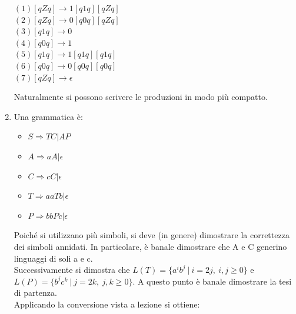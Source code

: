 \documentclass[a4paper,11pt]{article}
\begin{document}
\begin{enumerate}
\begin{minipage}{\linewidth}
        $(1) [qZq] \rightarrow 1[q1q][qZq]$\\
        $(2) [qZq] \rightarrow 0[q0q][qZq]$\\
        $(3) [q1q] \rightarrow 0$\\
        $(4) [q0q] \rightarrow 1$\\
        $(5) [q1q] \rightarrow 1[q1q][q1q]$\\
        $(6) [q0q] \rightarrow 0[q0q][q0q]$\\
        $(7) [qZq] \rightarrow \epsilon$\\
      \end{minipage}
      Naturalmente si possono scrivere le produzioni in modo più compatto.
       \item Una grammatica è:
       \begin{itemize}
       \item $S \Rightarrow TC | AP$
    \item $A \Rightarrow aA | \epsilon$
\item $C \Rightarrow cC | \epsilon$
\item $T \Rightarrow aaTb | \epsilon$
\item $P \Rightarrow bbPc | \epsilon $
       \end{itemize}
       Poiché si utilizzano più simboli, si deve (in genere) dimostrare la correttezza dei simboli annidati. In particolare, è banale dimostrare che A e C generino linguaggi di soli a e c.\\
       Successivamente si dimostra che $L(T)=\{a^ib^j \ |\ i=2j, \ i,j\geq 0 \}$ e $L(P)=\{b^jc^k \ |\ j=2k, \ j,k\geq 0 \}$. A questo punto è banale dimostrare la tesi di partenza.\\
       Applicando la conversione vista a lezione si ottiene:\\

\end{enumerate}
\end{document}
